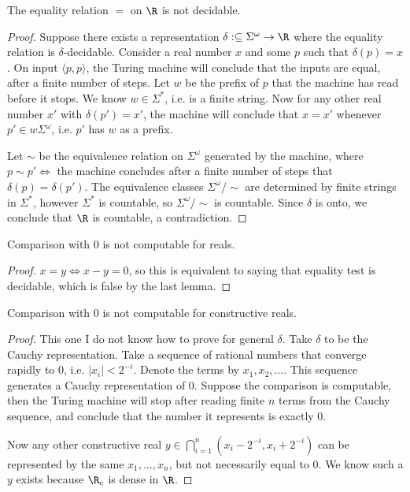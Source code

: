 
\begin{lemma}
	The equality relation  $=$ on $\R$ is not decidable.
\end{lemma}
\begin{proof}
	Suppose there exists a representation $\delta:\subseteq \Sigma^\omega \to \R$ where the equality relation is $\delta$-decidable. Consider a real number $x$ and some $p$ such that $\delta(p) = x$. On input $\langle p, p\rangle$, the Turing machine will conclude that the inputs are equal, after a finite number of steps. Let $w$ be the prefix of $p$ that the machine has read before it stops. We know $w \in \Sigma^*$, i.e. is a finite string. Now for any other real number $x'$ with  $\delta(p') = x'$, the machine will conclude that  $x = x'$ whenever $p' \in w \Sigma^\omega$, i.e. $p'$ has $w$ as a prefix. 

	Let $\sim$ be the equivalence relation on $\Sigma^\omega$ generated by the machine, where $p \sim p' \iff $ the machine concludes after a finite number of steps that $\delta(p) = \delta(p')$. The equivalence classes $\Sigma^\omega / \sim$ are determined by finite strings in $\Sigma^*$, however $\Sigma^*$ is countable, so $\Sigma^\omega / \sim$ is countable. Since $\delta$ is onto, we conclude that  $\R$ is countable, a contradiction.
\end{proof}

\begin{lemma}
	Comparison with 0 is not computable for reals.
\end{lemma}
\begin{proof}
	$x = y \iff x - y = 0$, so this is equivalent to saying that equality test is decidable, which is false by the last lemma.
\end{proof}
\begin{lemma}
	Comparison with 0 is not computable for constructive reals.
\end{lemma}
\begin{proof}
	This one I do not know how to prove for general $\delta$. Take $\delta$ to be the Cauchy representation. Take a sequence of rational numbers that converge rapidly to 0, i.e. $|x_i|<2^{-i}$. Denote the terms by $x_1, x_2, \ldots$. This sequence generates a Cauchy representation of 0. Suppose the comparison is computable, then the Turing machine will stop after reading finite $n$ terms from the Cauchy sequence, and conclude that the number it represents is exactly 0. 

	Now any other constructive real $y \in \bigcap_{i=1}^n (x_i-2^{-i}, x_i + 2^{-i})$ can be represented by the same $x_1, \ldots, x_n$, but not necessarily equal to 0. We know such a $y$ exists because  $\R_c$ is dense in  $\R$.
\end{proof}




